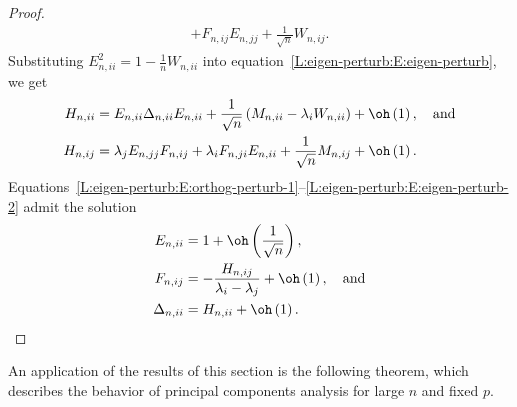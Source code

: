 \begin{proof}
\begin{subequations}
\begin{align}
         + 
         F_{n,ij} E_{n,jj} 
         + 
         \frac{1}{\sqrt{n}} W_{n,ij}.
         \label{L:eigen-perturb:E:orthog-perturb-2}
\end{align}
\end{subequations}
Substituting
\(
    E_{n,ii}^2 = 1 - \frac{1}{n} W_{n,ii}
\)
into equation~\eqref{L:eigen-perturb:E:eigen-perturb}, we get
\begin{subequations}
\begin{align}
    H_{n,ii} 
        &= E_{n,ii} \Delta_{n,ii} E_{n,ii}
           + 
           \frac{1}{\sqrt{n}} \left(
                M_{n,ii} - \lambda_i W_{n,ii}
           \right)
           +
           \oh \left( 1 \right), \quad \text{and} 
           \label{L:eigen-perturb:E:eigen-perturb-1} \\
    H_{n,ij}
        &= \lambda_j E_{n,jj} F_{n,ij}
           +
           \lambda_i F_{n,ji} E_{n,ii} 
           +
           \frac{1}{\sqrt{n}} M_{n,ij}
           +
           \oh \left( 1 \right).
           \label{L:eigen-perturb:E:eigen-perturb-2} 
\end{align}
\end{subequations}
Equations~\eqref{L:eigen-perturb:E:orthog-perturb-1}--\eqref{L:eigen-perturb:E:eigen-perturb-2} admit the solution
\begin{subequations}
\begin{align}
    E_{n,ii} 
        &= 1 + \oh\left(\frac{1}{\sqrt{n}}\right), \\
    F_{n,ij}
        &= -
           \frac{ H_{n,ij} }
                { \lambda_i - \lambda_j }
           +
           \oh \left( 1 \right), \quad \text{and} \\
    \Delta_{n,ii}
        &= H_{n,ii} + \oh\left( 1 \right).
\end{align}
\end{subequations}
\end{proof}

An application of the results of this section is the following theorem, which describes the behavior of principal components analysis for large $n$ and fixed $p$.

